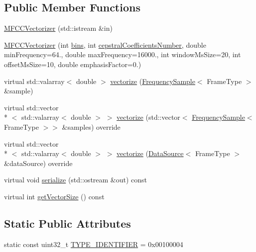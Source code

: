 \subsection*{Public Member Functions}
\begin{DoxyCompactItemize}
\item 
\hyperlink{classspeech_1_1vectorizer_1_1MFCCVectorizer_ababa626e7d260bdd7d3afb9694efe6a6}{M\+F\+C\+C\+Vectorizer} (std\+::istream \&in)
\item 
\hyperlink{classspeech_1_1vectorizer_1_1MFCCVectorizer_a84a36ac3b636e9f3460ba5bb0cb524e7}{M\+F\+C\+C\+Vectorizer} (int \hyperlink{classspeech_1_1vectorizer_1_1MFCCVectorizer_a179a54e359180354c417f980b222f1eb}{bins}, int \hyperlink{classspeech_1_1vectorizer_1_1MFCCVectorizer_a5f5083150768e6c9aad1777502e59a58}{cepstral\+Coefficients\+Number}, double min\+Frequency=64., double max\+Frequency=16000., int window\+Ms\+Size=20, int offset\+Ms\+Size=10, double emphasis\+Factor=0.)
\item 
virtual std\+::valarray$<$ double $>$ \hyperlink{classspeech_1_1vectorizer_1_1MFCCVectorizer_ad494d113915e9a5d0bbecda045cf8799}{vectorize} (\hyperlink{classspeech_1_1raw__data_1_1FrequencySample}{Frequency\+Sample}$<$ Frame\+Type $>$ \&sample)
\item 
virtual std\+::vector\\*
$<$ std\+::valarray$<$ double $>$ $>$ \hyperlink{classspeech_1_1vectorizer_1_1MFCCVectorizer_a21a1862ff866a77c540943f48a6511d2}{vectorize} (std\+::vector$<$ \hyperlink{classspeech_1_1raw__data_1_1FrequencySample}{Frequency\+Sample}$<$ Frame\+Type $>$$>$ \&samples) override
\item 
virtual std\+::vector\\*
$<$ std\+::valarray$<$ double $>$ $>$ \hyperlink{classspeech_1_1vectorizer_1_1MFCCVectorizer_a7faab008b85e4fd817a04194b6470e88}{vectorize} (\hyperlink{classspeech_1_1raw__data_1_1DataSource}{Data\+Source}$<$ Frame\+Type $>$ \&data\+Source) override
\item 
virtual void \hyperlink{classspeech_1_1vectorizer_1_1MFCCVectorizer_a5f266d0fc3ab4dd89a1d701531818930}{serialize} (std\+::ostream \&out) const 
\item 
virtual int \hyperlink{classspeech_1_1vectorizer_1_1MFCCVectorizer_a47475baa543b7fe77f227d1e0288b99d}{get\+Vector\+Size} () const 
\end{DoxyCompactItemize}
\subsection*{Static Public Attributes}
\begin{DoxyCompactItemize}
\item 
static const uint32\+\_\+t \hyperlink{classspeech_1_1vectorizer_1_1MFCCVectorizer_a43112849b3a53dcdeec39a9721e11364}{T\+Y\+P\+E\+\_\+\+I\+D\+E\+N\+T\+I\+F\+I\+E\+R} = 0x00100004
\end{DoxyCompactItemize}
